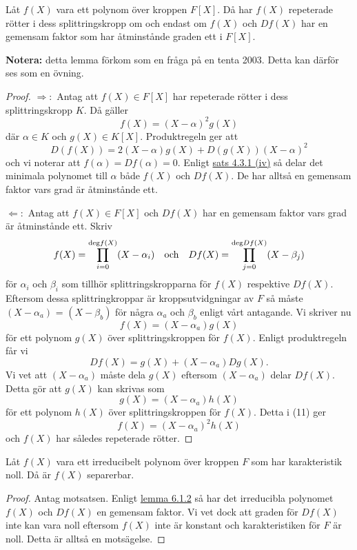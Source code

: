 \documentclass{article}
\newcommand{\grad}[0]{\textnormal{deg}}
\theoremstyle{definition}
\begin{document}
\hypertarget{lemma7.1.2}{}
\begin{mylemma}{}{}
  Låt $f(X)$ vara ett polynom över kroppen $F[X]$. Då har $f(X)$ repeterade rötter i dess splittringskropp om och endast om $f(X)$ och $Df(X)$
  har en gemensam faktor som har åtminstånde graden ett i $F[X]$.
\end{mylemma}
\textbf{Notera:} detta lemma förkom som en fråga på en tenta 2003. Detta kan därför ses som en övning. 
\begin{proof}
  $\Rightarrow:$ Antag att $f(X) \in F[X]$ har repeterade rötter i dess splittringskropp $K$. Då gäller 
  \[f(X) = (X-\alpha)^2 g(X)\]
  där $\alpha \in K$ och $g(X) \in K[X].$ Produktregeln ger att 
  \[D(f(X)) = 2(X- \alpha) g(X) + D(g(X)) (X - \alpha)^2\]
  och vi noterar att $f(\alpha) = Df(\alpha) = 0.$ Enligt \hyperlink{minpol}{sats 4.3.1 (iv)} så delar det minimala polynomet till $\alpha$ både 
  $f(X)$ och $Df(X)$. De har alltså en gemensam faktor vars grad är åtminstånde ett. 

  $\Leftarrow:$ Antag att $f(X) \in F[X]$ och $Df(X)$ har en gemensam faktor vars grad är åtminstånde ett. 
  Skriv 
  \[f(X) = \prod_{i = 0}^{\grad f(X)} (X-\alpha_i) \quad \textnormal{och} \quad Df(X) = \prod_{j = 0}^{\grad Df(X)} (X-\beta_j)\]
  för $\alpha_i$ och $\beta_i$ som tillhör splittringskropparna för $f(X)$ respektive $Df(X)$. Eftersom dessa 
  splittringkroppar är kroppsutvidgningar av $F$ så måste $(X - \alpha_a)$ = $(X - \beta_b)$ för några $\alpha_a$ och $\beta_b$ enligt vårt antagande. 
  Vi skriver nu 
  \begin{equation}
    f(X) = (X-\alpha_a)g(X)
  \end{equation}
  för ett polynom $g(X)$ över splittringskroppen för $f(X)$. Enligt produktregeln får vi 
  \[Df(X) = g(X) + (X - \alpha_a)Dg(X).\]
  Vi vet att $(X - \alpha_a)$ måste dela $g(X)$ eftersom $(X - \alpha_a)$ delar $Df(X)$. Detta gör att $g(X)$ kan skrivas som
  \[g(X) = (X - \alpha_a)h(X)\]
  för ett polynom $h(X)$ över splittringskroppen för $f(X)$. Detta i (11) ger 
  \[f(X) = (X - \alpha_a)^2h(X)\]
  och $f(X)$ har således repeterade rötter.
\end{proof}

\hypertarget{irrsep}{}
\begin{myprop}{}{}
  Låt $f(X)$ vara ett irreducibelt polynom över kroppen $F$ som har karakteristik noll. Då är $f(X)$ separerbar. 
\end{myprop}

\begin{proof}
  Antag motsatsen. Enligt \hyperlink{lemma7.1.2}{lemma 6.1.2} så har det irreducibla polynomet $f(X)$ och $Df(X)$ en gemensam faktor. 
  Vi vet dock att graden för $Df(X)$ inte kan vara noll eftersom $f(X)$ inte är konstant och karakteristiken för $F$ är noll. Detta är alltså 
  en motsägelse.
\end{proof}
\end{document}
